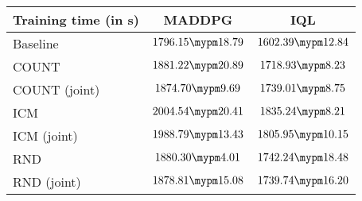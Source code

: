 \begin{tabular}{l | c c}
	Training time (in s) & MADDPG & IQL\\ \toprule
		Baseline & $1796.15 \mypm 18.79$ & $1602.39 \mypm 12.84$ \\ \midrule
	COUNT & $1881.22 \mypm 20.89$ & $1718.93 \mypm 8.23$ \\
	COUNT (joint) & $1874.70 \mypm 9.69$ & $1739.01 \mypm 8.75$ \\\midrule
	ICM & $2004.54 \mypm 20.41$ & $1835.24 \mypm 8.21$ \\
	ICM (joint) & $1988.79 \mypm 13.43$ & $1805.95 \mypm 10.15$ \\\midrule
	RND & $1880.30 \mypm 4.01$ & $1742.24 \mypm 18.48$ \\
	RND (joint) & $1878.81 \mypm 15.08$ & $1739.74 \mypm 16.20$ \\\midrule
\end{tabular}
